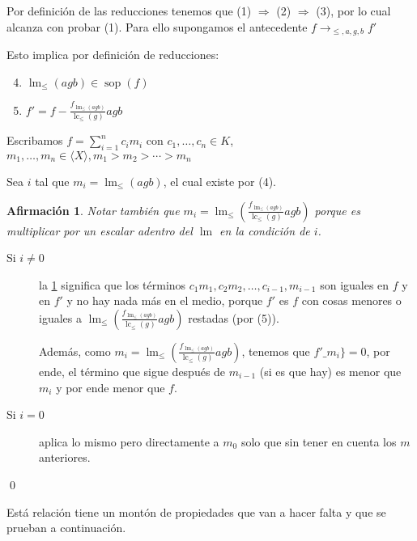 \documentclass[12pt]{report}
\theoremstyle{customstyle}
\renewenvironment{proof}[1][\proofname]{{\bfseries #1: }}{\qed} %
\theoremstyle{factstyle}
\newtheorem{fact}{Afirmación}[theorem]
\DeclareMathOperator{\sop}{sop}
\DeclareMathOperator{\lm}{lm}
\DeclareMathOperator{\lc}{lc}
\begin{document}
  \begin{proof}
  Por definición de las reducciones tenemos que (1) $⇒$ (2) $⇒$ (3), por lo cual alcanza con probar (1). Para ello supongamos el antecedente $f →_{≤, a, g, b} f'$

  Esto implica por definición de reducciones:
  \begin{enumerate}
    \setcounter{enumi}{3}
    \item $\lm_≤(agb) ∈ \sop(f)$
    \item $f' = f - \frac{f_{\lm_≤(agb)}}{\lc_≤(g)}agb$
  \end{enumerate}

  Escribamos $f = ∑_{i = 1}^n c_i m_i$ con $c_1, …, c_n ∈ K$, $m_1, …, m_n ∈ ⟨X⟩, m_1 > m_2 > ⋯ > m_n$

  Sea $i$ tal que $m_i = \lm_≤(agb)$, el cual existe por (4).

  \begin{fact}\label{fact:→ achican:3}
    Notar también que $m_i = \lm_≤(\frac{f_{\lm_≤(agb)}}{\lc_≤(g)}agb)$ porque es multiplicar por un escalar adentro del $\lm$ en la condición de $i$.
  \end{fact}
  \begin{description}
    \item[Si $i ≠ 0$] la \cref{fact:→ achican:3} significa que los términos $c_1 m_1, c_2 m_2, …, c_{i-1}, m_{i-1}$ son iguales en $f$ y en $f'$ y no hay nada más en el medio, porque $f'$ es $f$ con cosas menores o iguales a $\lm_≤(\frac{f_{\lm_≤(agb)}}{\lc_≤(g)}agb)$ restadas (por (5)).

    Además, como $m_i = \lm_≤(\frac{f_{\lm_≤(agb)}}{\lc_≤(g)}agb)$, tenemos que $f'\_m_i\} = 0$, por ende, el término que sigue después de $m_{i-1}$ (si es que hay) es menor que $m_i$ y por ende menor que $f$.

    \item[Si $i = 0$] aplica lo mismo pero directamente a $m_0$ solo que sin tener en cuenta los $m$ anteriores.
  \end{description}

\end{proof}

Está relación tiene un montón de propiedades que van a hacer falta y que se prueban a continuación.
\end{document}
